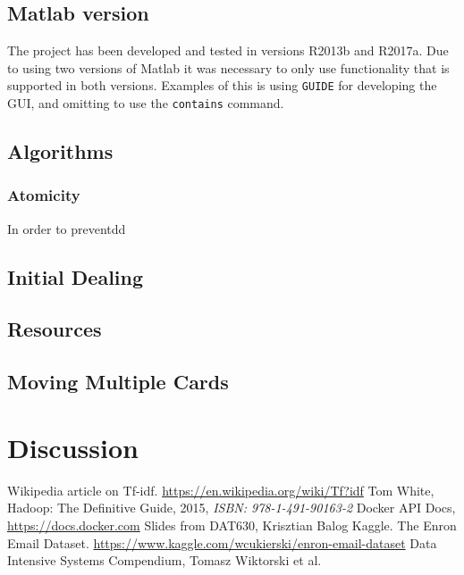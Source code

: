 \documentclass[runningheads,a4paper]{llncs}
\begin{document}
\subsection{Matlab version}
The project has been developed and tested in versions R2013b and R2017a. Due to using two versions of Matlab it was necessary to only use functionality that is supported in both versions. Examples of this is using \verb!GUIDE! for developing the GUI, and omitting to use the \verb!contains! command.
\label{sec:3_testing_analysis}
\subsection{Algorithms}
\subsubsection{Atomicity}
In order to preventdd
\subsection{Initial Dealing}
\label{sec:3_initial_dealing}
\subsection{Resources}
\subsection{Moving Multiple Cards}

\section{Discussion}



\begin{thebibliography}{6}

 Wikipedia article on Tf-idf. \url{https://en.wikipedia.org/wiki/Tf?idf}
 Tom White, Hadoop: The Definitive Guide, 2015, \emph{ISBN: 978-1-491-90163-2}
 Docker API Docs, \url{https://docs.docker.com}
 Slides from DAT630, Krisztian Balog
 Kaggle. The Enron Email Dataset. \url{https://www.kaggle.com/wcukierski/enron-email-dataset}
 Data Intensive Systems Compendium, Tomasz Wiktorski et al.

\end{thebibliography}
\appendix
\end{document}

